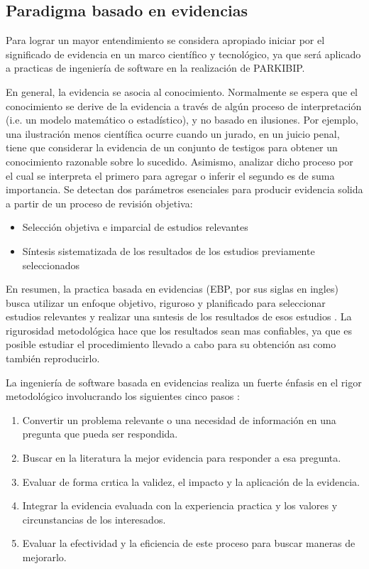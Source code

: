 \subsection{Paradigma basado en evidencias}

Para lograr un mayor entendimiento se considera apropiado iniciar por el significado de \gls{evidencia} en un marco científico y tecnológico, ya que será aplicado a practicas de ingeniería de software en la realización de PARKIBIP.

En general, la evidencia se asocia al conocimiento. Normalmente se espera que el conocimiento se derive de la evidencia a través de algún proceso de interpretación (i.e. un modelo matemático o estadístico), y no basado en ilusiones. Por ejemplo, una ilustración menos científica ocurre cuando un jurado, en un juicio penal, tiene que considerar la evidencia de un conjunto de testigos para obtener un conocimiento razonable sobre lo sucedido. Asimismo, analizar dicho proceso por el cual se interpreta el primero para agregar o inferir el segundo es de suma importancia. Se detectan dos parámetros esenciales para producir evidencia solida a partir de un proceso de revisión objetiva: 

\begin{itemize}
    \item Selección objetiva e imparcial de estudios relevantes 
    \item Síntesis sistematizada de los resultados de los estudios previamente seleccionados
\end{itemize}

En resumen, la practica basada en evidencias (EBP, por sus siglas en ingles) busca utilizar un enfoque objetivo, riguroso y planificado para seleccionar estudios relevantes y realizar una sıntesis de los resultados de esos estudios \cite{Kitchenham2006}. La rigurosidad metodológica hace que los resultados sean mas confiables, ya que es posible estudiar el procedimiento llevado a cabo para su obtención ası como también reproducirlo.

La ingeniería de software basada en evidencias realiza un fuerte énfasis en el rigor metodológico involucrando los siguientes cinco pasos \cite{Kitchenham2004, Pizard}:

\begin{enumerate}
    \item Convertir un problema relevante o una necesidad de información en una pregunta que pueda ser respondida.
    \item Buscar en la literatura la mejor evidencia para responder a esa pregunta.
    \item Evaluar de forma crıtica la validez, el impacto y la aplicación de la evidencia.
    \item Integrar la evidencia evaluada con la experiencia practica y los valores y circunstancias de los interesados.
    \item Evaluar la efectividad y la eficiencia de este proceso para buscar maneras de mejorarlo.
\end{enumerate}

